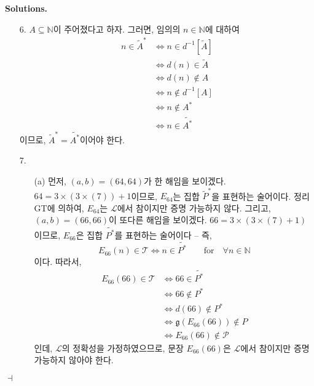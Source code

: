 \documentclass[12pt]{paper}
\newcommand{\gnum}
{ \mathfrak{g}
}
\newenvironment{context}[1][]
{ \noindent \textbf{{#1}.}
}
{ \hfill $ \dashv $
}
\begin{document}
\begin{context}[Solutions]
\begin{enumerate}
      \item[{6.}] $A \subseteq \mathbb{N}$이 주어졌다고 하자.
      그러면, 임의의 $n \in \mathbb{N}$에 대하여
      \begin{align*}
        n \in \tilde{A}^{*}
        & \iff n \in d^{-1} \left[ \tilde{A} \right] \\
        & \iff d \left( n \right) \in \tilde{A} \\
        & \iff d \left( n \right) \notin A \\
        & \iff n \notin d^{-1} \left[ A \right] \\
        & \iff n \notin A^{*} \\
        & \iff n \in \widetilde{A^{*}}
      \end{align*}
      이므로, $\tilde{A}^{*} = \widetilde{A^{*}}$이어야 한다.

      \item[{7.}]
      \begin{itemize}
        \item[(a)] 먼저, $\left( a , b \right) = \left( 64 , 64 \right)$가 한 해임을 보이겠다. 
        $64 = 3 \times \left( 3 \times \left( 7 \right) \right) + 1$이므로,
        $E_{64}$는 집합 $\tilde{P}^{*}$을 표현하는 술어이다.
        정리 GT에 의하여, $E_{64}$는 $\mathcal{L}$에서 참이지만 증명 가능하지 않다.
        그리고, $\left( a , b \right) = \left( 66 , 66 \right)$이 또다른 해임을 보이겠다.
        $66 = 3 \times \left( 3 \times \left( 7 \right) + 1 \right)$이므로,
        $E_{66}$은 집합 $\widetilde{P^{*}}$를 표현하는 술어이다 --
        즉, $$ E_{66} \left( n \right) \in \mathcal{T} \iff n \in \widetilde{P^{*}} \qquad \mathrm{for} \quad \forall n \in \mathbb{N} $$이다.
        따라서,
        \begin{align*}
          E_{66} \left( 66 \right) \in \mathcal{T}
          & \iff 66 \in \widetilde{P^{*}} \\
          & \iff 66 \notin P^{*} \\
          & \iff d \left( 66 \right) \notin P^{*} \\
          & \iff \gnum \left( E_{66} \left( 66 \right) \right) \notin P \\
          & \iff E_{66} \left( 66 \right) \notin \mathcal{P}
        \end{align*}
        인데, $\mathcal{L}$의 정확성을 가정하였으므로,
        문장 $E_{66} \left( 66 \right)$은 $\mathcal{L}$에서 참이지만 증명 가능하지 않아야 한다.


\end{itemize}
\end{enumerate}
\end{context}
\end{document}
